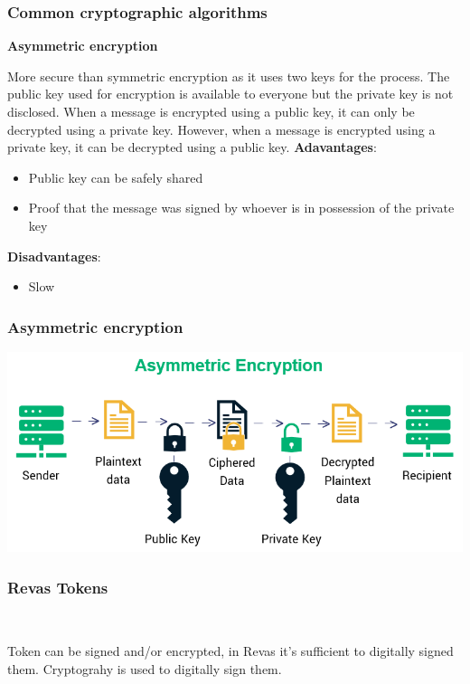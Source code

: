 \documentclass{beamer}
\begin{document}
\begin{frame}
	\frametitle{Common cryptographic algorithms}
	
	{\footnotesize \textbf{\textcolor{revassecondary}{Asymmetric encryption}}}
	
	More secure than symmetric encryption as it uses two keys for the process.
	The public key used for encryption is available to everyone but the private key is not disclosed.
	When a message is encrypted using a public key, it can only be decrypted using a private key. However, when a message is encrypted using a private key, it can be decrypted using a public key. \newline
	{\footnotesize \textbf{\textcolor{revassecondary}{Adavantages}}}: 
	\begin{itemize}	
		\item Public key can be safely shared
		\item Proof that the message was signed by whoever is in possession of the private key 
	\end{itemize}	
	
	 {\footnotesize \textbf{\textcolor{revassecondary}{Disadvantages}}}: 
	\begin{itemize}	
		\item Slow
	\end{itemize}
\end{frame}

\begin{frame}
	\frametitle{Asymmetric encryption}
	
	\includegraphics[width=\textwidth]{./resources/asymmetric_encryption.png}
	
\end{frame}

\begin{frame}
	\frametitle{Revas Tokens}\ \newline
	
	Token can be signed and/or encrypted, in Revas it's sufficient to digitally signed them.
	Cryptograhy is used to digitally sign them.
\end{frame}
\end{document}
